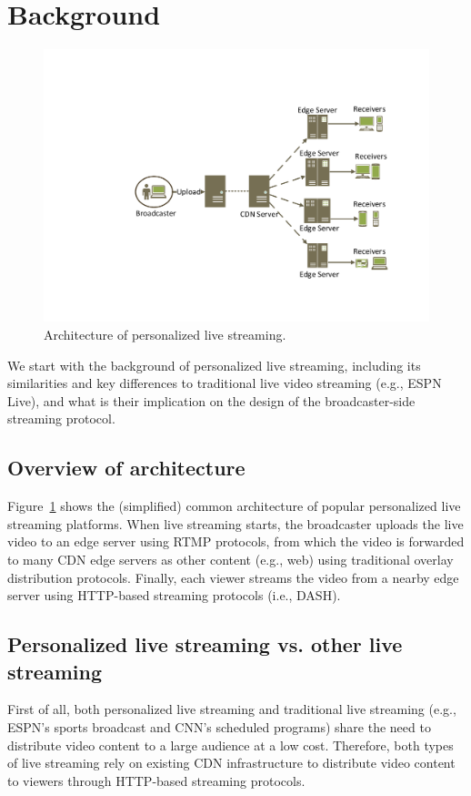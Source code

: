 \section{Background}

\begin{figure}[t]
\centerline{\includegraphics[width=0.9\columnwidth]{fig/architecture.pdf}}
\vspace{-0.08in}
\caption{Architecture of personalized live streaming.}
\vspace{-0.1in}
\label{fig:architecture}
\end{figure}

We start with the background of personalized live streaming, including
its similarities and key differences to traditional live video 
streaming (e.g., ESPN Live), and what is their implication on the design 
of the broadcaster-side streaming protocol.

\subsection{Overview of architecture}
Figure~\ref{fig:architecture} shows the (simplified) common architecture 
of popular personalized live streaming platforms. When live streaming 
starts, the broadcaster uploads the live video to an edge server using 
RTMP protocols, from which the video is forwarded to many CDN edge servers 
as other content (e.g., web) using traditional overlay distribution 
protocols. Finally, each viewer streams the video from a nearby edge
server using HTTP-based streaming protocols (i.e., DASH).

\subsection{Personalized live streaming vs. other live streaming}
First of all, both personalized live streaming and
traditional live streaming (e.g., ESPN's sports broadcast
and CNN's scheduled programs) share the need to
distribute video content to a large audience at a low cost.
Therefore, both types of live streaming rely on existing
CDN infrastructure to distribute video content to viewers through 
HTTP-based streaming protocols.

